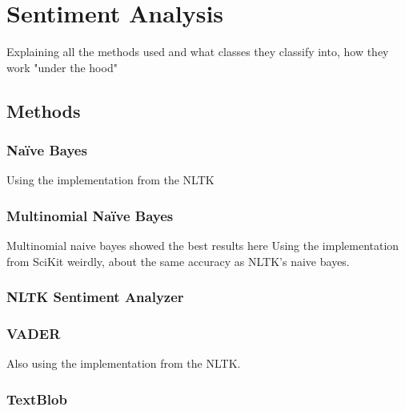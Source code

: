 \chapter{Sentiment Analysis}
\label{ch:sentimentAnalysis}


Explaining all the methods used and what classes they classify into, how they work "under the hood"

\section{Methods}
\label{sec:methods}

\subsection{Na\"{i}ve Bayes}
\label{subsec:naivebayes}

Using the implementation from the NLTK

\subsection{Multinomial Na\"{i}ve Bayes}
\label{subsec:multinomialnaivebayes}

Multinomial naive bayes showed the best results here \cite{Go2009}
Using the implementation from SciKit
weirdly, about the same accuracy as NLTK's naive bayes.

\subsection{NLTK Sentiment Analyzer}
\label{subsec:nltksentimentanalyzer}

\subsection{VADER}
\label{subsec:vader}

Also using the implementation from the NLTK.
\cite{Hutto2014}

\subsection{TextBlob}
\label{subsec:textblob}

